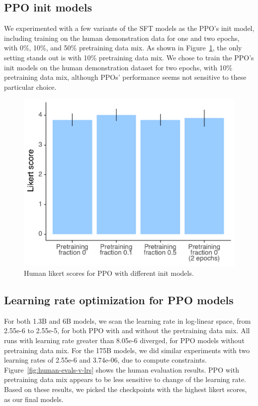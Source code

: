 \documentclass{article}
\begin{document}
\subsection{PPO init models}

We experimented with a few variants of the SFT models as the PPO's init model, including training on the human demonstration data for one and two epochs, with 0\%, 10\%, and 50\% pretraining data mix. As shown in Figure~\ref{fig:ppo-init-model-comparison}, the only setting stands out is with 10\% pretraining data mix. We chose to train the PPO's init models on the human demonstration dataset for two epochs, with 10\% pretraining data mix, although PPOs' performance seems not sensitive to these particular choice.

\begin{figure}
    \centering
    \includegraphics[width=0.5\linewidth]{figs/lik-v-init.pdf}
    \caption{Human likert scores for PPO with different init models.}
    \label{fig:ppo-init-model-comparison}
\end{figure}

\subsection{Learning rate optimization for PPO models}

For both 1.3B and 6B models, we scan the learning rate in log-linear space, from 2.55e-6 to 2.55e-5, for both PPO with and without the pretraining data mix. All runs with learning rate greater than 8.05e-6 diverged, for PPO models without pretraining data mix. For the 175B models, we did similar experiments with two learning rates of 2.55e-6 and 3.74e-06, due to compute constraints. Figure~\ref{fig:human-evals-v-lrs} shows the human evaluation results. PPO with pretraining data mix appears to be less sensitive to change of the learning rate. Based on these results, we picked the checkpoints with 
the highest likert scores, as our final models.
\end{document}
